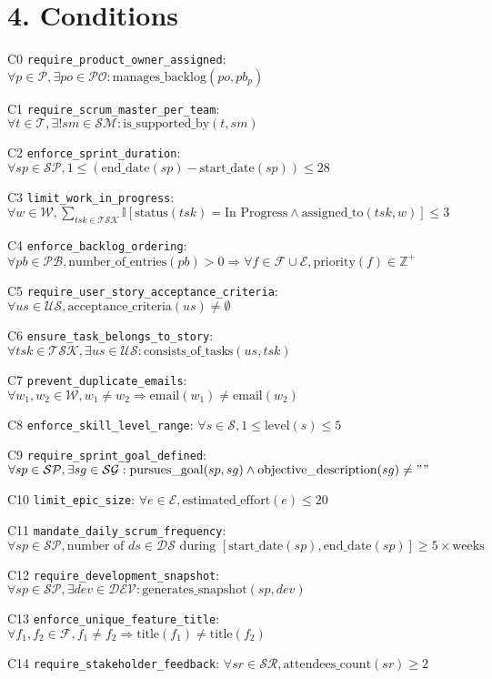 \documentclass[12pt]{article}
\begin{document}
\section{4. Conditions}
\item[C0] \texttt{require\_product\_owner\_assigned}: $ \forall p \in \mathcal{P}, \exists po \in \mathcal{PO}: \text{manages\_backlog}(po, pb_p) $
    \item[C1] \texttt{require\_scrum\_master\_per\_team}: $ \forall t \in \mathcal{T}, \exists! sm \in \mathcal{SM}: \text{is\_supported\_by}(t, sm) $
    \item[C2] \texttt{enforce\_sprint\_duration}: $ \forall sp \in \mathcal{SP}, 1 \leq (\text{end\_date}(sp) - \text{start\_date}(sp)) \leq 28 $
    \item[C3] \texttt{limit\_work\_in\_progress}: $ \forall w \in \mathcal{W}, \sum_{tsk \in \mathcal{TSK}} \mathbb{I}[\text{status}(tsk) = \text{In Progress} \land \text{assigned\_to}(tsk, w)] \leq 3 $
    \item[C4] \texttt{enforce\_backlog\_ordering}: $ \forall pb \in \mathcal{PB}, \text{number\_of\_entries}(pb) > 0 \Rightarrow \forall f \in \mathcal{F} \cup \mathcal{E}, \text{priority}(f) \in \mathbb{Z}^+ $
    \item[C5] \texttt{require\_user\_story\_acceptance\_criteria}: $ \forall us \in \mathcal{US}, \text{acceptance\_criteria}(us) \neq \emptyset $
    \item[C6] \texttt{ensure\_task\_belongs\_to\_story}: $ \forall tsk \in \mathcal{TSK}, \exists us \in \mathcal{US}: \text{consists\_of\_tasks}(us, tsk) $
    \item[C7] \texttt{prevent\_duplicate\_emails}: $ \forall w_1, w_2 \in \mathcal{W}, w_1 \neq w_2 \Rightarrow \text{email}(w_1) \neq \text{email}(w_2) $
    \item[C8] \texttt{enforce\_skill\_level\_range}: $ \forall s \in \mathcal{S}, 1 \leq \text{level}(s) \leq 5 $
    \item[C9] \texttt{require\_sprint\_goal\_defined}: $ \forall sp \in \mathcal{SP}, \exists sg \in \mathcal{SG}: \text{pursues\_goal}(sp, sg) \land \text{objective\_description}(sg) \neq "" $
    \item[C10] \texttt{limit\_epic\_size}: $ \forall e \in \mathcal{E}, \text{estimated\_effort}(e) \leq 20 $
    \item[C11] \texttt{mandate\_daily\_scrum\_frequency}: $ \forall sp \in \mathcal{SP}, \text{number of } ds \in \mathcal{DS} \text{ during } [\text{start\_date}(sp), \text{end\_date}(sp)] \geq 5 \times \text{weeks} $
    \item[C12] \texttt{require\_development\_snapshot}: $ \forall sp \in \mathcal{SP}, \exists dev \in \mathcal{DEV}: \text{generates\_snapshot}(sp, dev) $
    \item[C13] \texttt{enforce\_unique\_feature\_title}: $ \forall f_1, f_2 \in \mathcal{F}, f_1 \neq f_2 \Rightarrow \text{title}(f_1) \neq \text{title}(f_2) $
    \item[C14] \texttt{require\_stakeholder\_feedback}: $ \forall sr \in \mathcal{SR}, \text{attendees\_count}(sr) \geq 2 $
\end{document}
